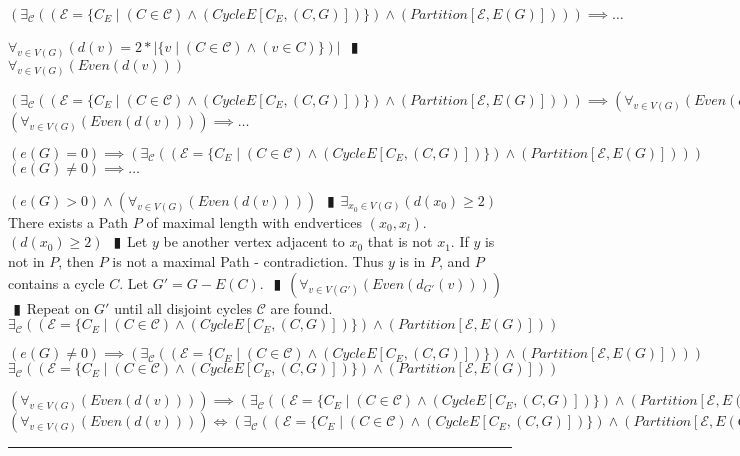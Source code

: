 \documentclass{book}
\newcommand{\pipe}{$\phantom{(}\vrectangleblack\phantom{)}$}
\newcommand{\pr}[1]{\left(#1\right)}
\newcommand{\st}{\mathbin{|}}
\begin{document}
\begin{enumerate}
  \lit $\pr{\exists_{\mathcal{C}}\pr{\pr{\mathcal{E} = \{C_E \st (C \in \mathcal{C}) \land \pr{CycleE[C_E, (C, G)]}\}} \land \pr{Partition[\mathcal{E}, E(G)]}}} \implies \ldots$
  \begin{enumerate}
    \lit $\forall_{v \in V(G)}\pr{d(v) = 2 * |\{v \st (C \in \mathcal{C}) \land (v \in C)\}}|$ \pipe $\forall_{v \in V(G)}\pr{Even\pr{d(v)}}$
  \end{enumerate}
  \lit $\pr{\exists_{\mathcal{C}}\pr{\pr{\mathcal{E} = \{C_E \st (C \in \mathcal{C}) \land \pr{CycleE[C_E, (C, G)]}\}} \land \pr{Partition[\mathcal{E}, E(G)]}}} \implies \pr{\forall_{v \in V(G)}\pr{Even\pr{d(v)}}}$
  \lit $\pr{\forall_{v \in V(G)}\pr{Even\pr{d(v)}}} \implies \ldots$
  \begin{enumerate}
    \lit $\pr{e(G) = 0} \implies \pr{\exists_{\mathcal{C}}\pr{\pr{\mathcal{E} = \{C_E \st (C \in \mathcal{C}) \land \pr{CycleE[C_E, (C, G)]}\}} \land \pr{Partition[\mathcal{E}, E(G)]}}}$
    \lit $\pr{e(G) \neq 0} \implies \ldots$
    \begin{enumerate}
      \lit $\pr{e(G) > 0} \land \pr{\forall_{v \in V(G)}\pr{Even\pr{d(v)}}}$ \pipe $\exists_{x_0 \in V(G)}\pr{d(x_0) \geq 2}$
      \lit There exists a Path $P$ of maximal length with endvertices $(x_0, x_l)$.
      \lit $\pr{d(x_0) \geq 2}$ \pipe Let $y$ be another vertex adjacent to $x_0$ that is not $x_1$.
      \lit If $y$ is not in $P$, then $P$ is not a maximal Path - contradiction.
      \lit Thus $y$ is in $P$, and $P$ contains a cycle $C$.
      \lit Let $G' = G - E(C)$. \pipe $\pr{\forall_{v \in V(G')}\pr{Even\pr{d_{G'}(v)}}}$ \pipe Repeat on $G'$ until all disjoint cycles $\mathcal{C}$ are found.
      \lit $\exists_{\mathcal{C}}\pr{\pr{\mathcal{E} = \{C_E \st (C \in \mathcal{C}) \land \pr{CycleE[C_E, (C, G)]}\}} \land \pr{Partition[\mathcal{E}, E(G)]}}$
    \end{enumerate}
    \lit $\pr{e(G) \neq 0} \implies \pr{\exists_{\mathcal{C}}\pr{\pr{\mathcal{E} = \{C_E \st (C \in \mathcal{C}) \land \pr{CycleE[C_E, (C, G)]}\}} \land \pr{Partition[\mathcal{E}, E(G)]}}}$
    \lit $\exists_{\mathcal{C}}\pr{\pr{\mathcal{E} = \{C_E \st (C \in \mathcal{C}) \land \pr{CycleE[C_E, (C, G)]}\}} \land \pr{Partition[\mathcal{E}, E(G)]}}$
  \end{enumerate}
  \lit $\pr{\forall_{v \in V(G)}\pr{Even\pr{d(v)}}} \implies \pr{\exists_{\mathcal{C}}\pr{\pr{\mathcal{E} = \{C_E \st (C \in \mathcal{C}) \land \pr{CycleE[C_E, (C, G)]}\}} \land \pr{Partition[\mathcal{E}, E(G)]}}}$
  \lit $\pr{\forall_{v \in V(G)}\pr{Even\pr{d(v)}}} \iff \pr{\exists_{\mathcal{C}}\pr{\pr{\mathcal{E} = \{C_E \st (C \in \mathcal{C}) \land \pr{CycleE[C_E, (C, G)]}\}} \land \pr{Partition[\mathcal{E}, E(G)]}}}$
\end{enumerate} \vspace{.75mm} \hrule \vspace{.75mm} \ \\ 
\end{document}

